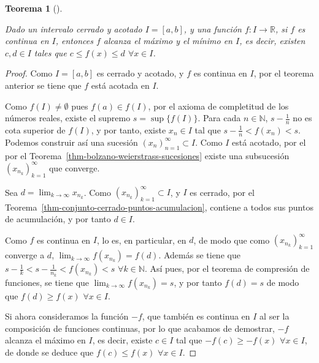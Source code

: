 \documentclass[
  a4paper,
]{scrreport}
\theoremstyle{plain}
\theoremstyle{plain}
\theoremstyle{definition}
\theoremstyle{definition}
\theoremstyle{plain}
\newtheorem{theorem}{Teorema}[chapter]
\theoremstyle{remark}
\begin{document}
\leavevmode{}%
\begin{theorem}[]\label{thm-extremos-funcion-continua-intervalo-cerrado}

Dado un intervalo cerrado y acotado \(I=[a,b]\), y una función
\(f:I\to\mathbb{R}\), si \(f\) es continua en \(I\), entonces \(f\)
alcanza el máximo y el mínimo en \(I\), es decir, existen \(c,d\in I\)
tales que \(c\leq f(x)\leq d\) \(\forall x\in I\).

\end{theorem}

\begin{tcolorbox}[enhanced jigsaw, breakable, bottomrule=.15mm, coltitle=black, bottomtitle=1mm, opacityback=0, title=\textcolor{quarto-callout-note-color}{\faInfo}\hspace{0.5em}{Demostración}, left=2mm, toptitle=1mm, toprule=.15mm, opacitybacktitle=0.6, colframe=quarto-callout-note-color-frame, arc=.35mm, colback=white, rightrule=.15mm, titlerule=0mm, leftrule=.75mm, colbacktitle=quarto-callout-note-color!10!white]

\begin{proof}

Como \(I=[a,b]\) es cerrado y acotado, y \(f\) es continua en \(I\), por
el teorema anterior se tiene que \(f\) está acotada en \(I\).

Como \(f(I)\neq \emptyset\) pues \(f(a)\in f(I)\), por el axioma de
completitud de los números reales, existe el supremo \(s=\sup\{f(I)\}\).
Para cada \(n\in\mathbb{N}\), \(s-\frac{1}{n}\) no es cota superior de
\(f(I)\), y por tanto, existe \(x_n\in I\) tal que
\(s-\frac{1}{n}<f(x_n)<s\). Podemos construir así una sucesión
\((x_n)_{n=1}^\infty\subset I\). Como \(I\) está acotado, por el por el
Teorema~\ref{thm-bolzano-weierstrass-sucesiones} existe una subsucesión
\((x_{n_k})_{k=1}^\infty\) que converge.

Sea \(d=\lim_{k\to\infty}x_{n_k}\). Como
\((x_{n_k})_{k=1}^\infty\subset I\), y \(I\) es cerrado, por el
Teorema~\ref{thm-conjunto-cerrado-puntos-acumulacion}, contiene a todos
sus puntos de acumulación, y por tanto \(d\in I\).

Como \(f\) es continua en \(I\), lo es, en particular, en \(d\), de modo
que como \((x_{n_k})_{k=1}^\infty\) converge a \(d\),
\(\lim_{k\to\infty}f(x_{n_k}) = f(d)\). Además se tiene que
\(s-\frac{1}{k}<s-\frac{1}{n_k}<f(x_{n_k})<s\)
\(\forall k\in\mathbb{N}\). Así pues, por el teorema de compresión de
funciones, se tiene que \(\lim_{k\to\infty} f(x_{n_k})=s\), y por tanto
\(f(d)=s\) de modo que \(f(d)\geq f(x)\) \(\forall x\in I\).

Si ahora consideramos la función \(-f\), que también es continua en
\(I\) al ser la composición de funciones continuas, por lo que acabamos
de demostrar, \(-f\) alcanza el máximo en \(I\), es decir, existe
\(c\in I\) tal que \(-f(c)\geq -f(x)\) \(\forall x\in I\), de donde se
deduce que \(f(c)\leq f(x)\) \(\forall x\in I\).

\end{proof}

\end{tcolorbox}
\end{document}
